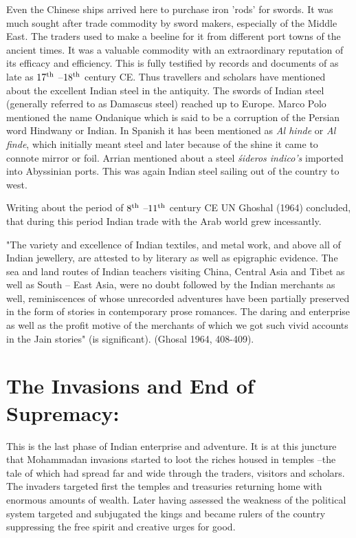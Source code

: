 Even the Chinese ships arrived here to purchase iron 'rods' for swords. It was much sought after trade commodity by sword makers, especially of the Middle East. The traders used to make a beeline for it from different port towns of the ancient times. It was a valuable commodity with an extraordinary reputation of its efficacy and efficiency. This is fully testified by records and documents of as late as $17^{\rm th}$ –$18^{\rm th}$ century CE. Thus travellers and scholars have mentioned about the excellent Indian steel in the antiquity. The swords of Indian steel (generally referred to as Damascus steel) reached up to Europe. Marco Polo mentioned the name Ondanique which is said to be a corruption of the Persian word Hindwany or Indian. In Spanish it has been mentioned as {\it Al hinde} or {\it Al finde}, which initially meant steel and later because of the shine it came to connote mirror or foil. Arrian mentioned about a steel {\it śideros indico's} imported into Abyssinian ports. This was again Indian steel sailing out of the country to west. 

Writing about the period of $8^{\rm th}$ –$11^{\rm th}$ century CE UN Ghoshal (1964) concluded, that during this period Indian trade with the Arab world grew incessantly.

 "The variety and excellence of Indian textiles, and metal work, and above all of Indian jewellery, are attested to by literary as well as epigraphic evidence. The sea and land routes of Indian teachers visiting China, Central Asia and Tibet as well as South – East Asia, were no doubt followed by the Indian merchants as well, reminiscences of whose unrecorded adventures have been partially preserved in the form of stories in contemporary prose romances. The daring and enterprise as well as the profit motive of the merchants of which we got such vivid accounts in the Jain stories" (is significant). (Ghosal 1964, 408-409).

\section*{The Invasions and End of Supremacy:}

This is the last phase of Indian enterprise and adventure. It is at this juncture that Mohammadan invasions started to loot the riches housed in temples –the tale of which had spread far and wide through the traders, visitors and scholars. The invaders targeted first the temples and treasuries returning home with enormous amounts of wealth. Later having assessed the weakness of the political system targeted and subjugated the kings and became rulers of the country suppressing the free spirit and creative urges for good.


